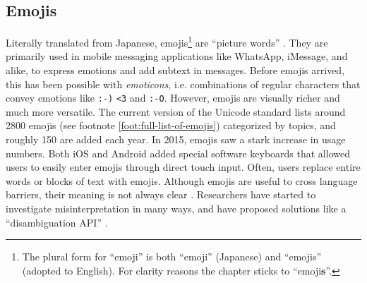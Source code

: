 \subsection{Emojis}
Literally translated from Japanese, emojis\footnote{The plural form for ``emoji'' is both ``emoji'' (Japanese) and ``emojis'' (adopted to English). For clarity reasons the chapter sticks to ``emoji\textbf{s}''.} are ``picture words'' \cite{Taggart2015NewWords}. They are primarily used in mobile messaging applications like WhatsApp, iMessage, and alike, to express emotions and add subtext in messages. Before emojis arrived, this has been possible with \textit{emoticons}, i.e. combinations of regular characters that convey emotions like \texttt{:-)} \texttt{<3} and \texttt{:-O}. However, emojis are visually richer and much more versatile. The current version of the Unicode standard lists around 2800 emojis (see footnote \ref{foot:full-list-of-emojis}) categorized by topics, and roughly 150 are added each year. In 2015, emojis saw a stark increase in usage numbers. Both iOS and Android added special software keyboards that allowed users to easily enter emojis through direct touch input. %
Often, users replace entire words or blocks of text with emojis. Although emojis are useful to cross language barriers, their meaning is not always clear \cite{Miller2015BlissfullyHappyEmoji,Tigwell2016EmojiMisunderstandings}. Researchers have started to investigate misinterpretation in many ways, and have proposed solutions like a ``disambiguation API'' \cite{Wijeratne2010}. 

